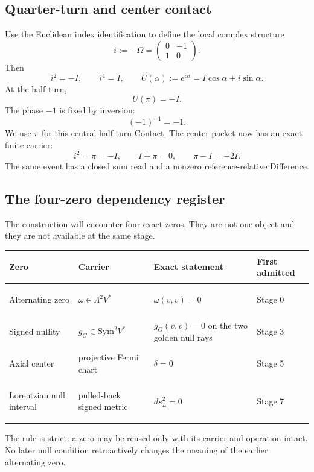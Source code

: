 \documentclass[11pt]{article}
\begin{document}
\subsection{Quarter-turn and center contact}

Use the Euclidean index identification to define the local complex structure
\[
i:=-\Omega=
\begin{pmatrix}
0&-1\\1&0
\end{pmatrix}.
\]
Then
\[
i^2=-I,
\qquad
i^4=I,
\qquad
U(\alpha):=e^{\alpha i}=I\cos\alpha+i\sin\alpha.
\]
At the half-turn,
\[
\boxed{U(\pi)=-I.}
\]
The phase $-1$ is fixed by inversion:
\[
(-1)^{-1}=-1.
\]
We use $\pi$ for this central half-turn Contact. The center packet now has an exact finite carrier:
\[
\boxed{i^2=\pi=-I,
\qquad
I+\pi=0,
\qquad
\pi-I=-2I.}
\]
The same event has a closed sum read and a nonzero reference-relative Difference.


\subsection{The four-zero dependency register}
The construction will encounter four exact zeros. They are not one object and they are not available at the same stage.

\begin{center}
\small
\begin{tabularx}{0.96\textwidth}{@{}>{\bfseries\raggedright\arraybackslash}p{}>{\raggedright\arraybackslash}p{}X>{\raggedright\arraybackslash}p{}@{}}
\toprule
Zero & Carrier & Exact statement & First admitted\\
\midrule
Alternating zero & $\omega\in\Lambda^2V^*$ & $\omega(v,v)=0$ & Stage 0\\
Signed nullity & $g_G\in\mathrm{Sym}^2V^*$ & $g_G(v,v)=0$ on the two golden null rays & Stage 3\\
Axial center & projective Fermi chart & $\delta=0$ & Stage 5\\
Lorentzian null interval & pulled-back signed metric & $ds_L^2=0$ & Stage 7\\
\bottomrule
\end{tabularx}
\normalsize
\end{center}

The rule is strict: a zero may be reused only with its carrier and operation intact. No later null condition retroactively changes the meaning of the earlier alternating zero.
\end{document}
